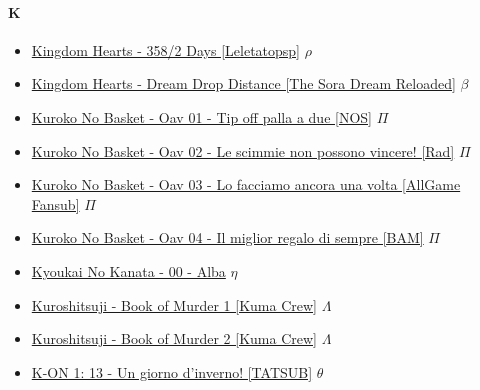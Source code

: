 		\paragraph{K} \hypertarget{OK}{}
			\begin{itemize}
				
				\item \href{https://mega.nz/#!MNB1AA6Y!pNgSzZgtTLnsBgCkLrYzfyyXXh8vLAsvjjVh0dSBaTM} {Kingdom Hearts - 358/2 Days [Leletatopsp]}  $\rho$   \\ 
				\item \href{https://mega.nz/#F!xtZyyDTI!dr2uUsaImy2Zbv3Ev0ASXg} {Kingdom Hearts - Dream Drop Distance [The Sora Dream Reloaded]}  $\beta$   \\ 
				\item \href{https://mega.nz/#!8DYkkLra!30qI9lAPVJycbyaRXeA_8lrmx2JwWL8keTm0yMiTGQ8} {Kuroko No Basket - Oav 01 - Tip off palla a due [NOS]}  $\varPi$   \\
				\item \href{https://mega.nz/#!AXBFTIzJ!QrU1ZgOWYwY3Jhq2-iV6B6f_NiDe7yXsgXK01SyC_5U} {Kuroko No Basket - Oav 02 - Le scimmie non possono vincere! [Rad]}  $\varPi$   \\
				\item \href{https://mega.nz/#!AKBEEIjL!bs1jgJx5ZpFUGzDJjAj1OGjRL5s6VxjrNTK22gjej60} {Kuroko No Basket - Oav 03 - Lo facciamo ancora una volta [AllGame Fansub]}  $\varPi$   \\
				\item \href{https://mega.nz/#!FeoHAbRZ!rQ7WmJh85seWoRQBMKu4jjLOAsTSQj2wNTaJ6ENLlKw} {Kuroko No Basket - Oav 04 - Il miglior regalo di sempre [BAM]}  $\varPi$   \\
				\item \href{https://mega.nz/#!IQcQmbiS!nmZtgdXCevur1WuwIM2DnttHKRAuUjY7w-H9q52hbKI} {Kyoukai No Kanata - 00 - Alba}  $\eta$   \\
				\item \href{https://mega.nz/#!MCJWVC4Q!ilpUIwM0c8eBiR3zfWAgFOrmZfXJVpguXOA9r3YPCJg} {Kuroshitsuji - Book of Murder 1 [Kuma Crew]}  $\varLambda$   \\
				\item \href{https://mega.nz/#!UPoHWYKB!KBO8IapECtX4ug4ZN3thbLtiFLmAjAP28JTHsw-d9bE} {Kuroshitsuji - Book of Murder 2 [Kuma Crew]}  $\varLambda$   \\
				\item \href{https://mega.nz/#!d5NhmT7B!A7oMLGI_YxwJ7_MMR7QM_DasiBddtSfsUHKs0CVeJ6c} {K-ON 1: 13 - Un giorno d'inverno! [TATSUB]}  $\theta$   \\

\end{itemize}
